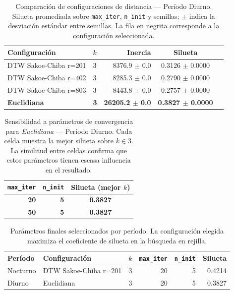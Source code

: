 \begin{table}[ht]
  \centering
  \caption{Comparación de configuraciones de distancia — Período Diurno. Silueta promediada sobre \texttt{max\_iter}, \texttt{n\_init} y semillas; $\pm$ indica la desviación estándar entre semillas. La fila en negrita corresponde a la configuración seleccionada.}
  \label{tab:tuning_config_daytime}
  \begin{tabular}{llrcc}
    \toprule
    \textbf{Configuración} & \textbf{$k$} & \textbf{Inercia} & \textbf{Silueta} \\
    \midrule
    DTW Sakoe-Chiba r=201 & 3 & 8376.9 $\pm$ 0.0 & 0.3126 $\pm$ 0.0000 \\
    DTW Sakoe-Chiba r=402 & 3 & 8285.3 $\pm$ 0.0 & 0.2790 $\pm$ 0.0000 \\
    DTW Sakoe-Chiba r=803 & 3 & 8443.8 $\pm$ 0.0 & 0.2757 $\pm$ 0.0000 \\
    \textbf{Euclidiana} & \textbf{3} & \textbf{26205.2 $\pm$ 0.0} & \textbf{0.3827 $\pm$ 0.0000} \\
    \bottomrule
  \end{tabular}
\end{table}

\begin{table}[ht]
  \centering
  \caption{Sensibilidad a parámetros de convergencia para \textit{Euclidiana} — Período Diurno. Cada celda muestra la mejor silueta sobre $k \in {3}$. La similitud entre celdas confirma que estos parámetros tienen escasa influencia en el resultado.}
  \label{tab:tuning_conv_daytime}
  \begin{tabular}{rrc}
    \toprule
    \textbf{\texttt{max\_iter}} & \textbf{\texttt{n\_init}} & \textbf{Silueta (mejor $k$)} \\
    \midrule
    \textbf{20} & \textbf{5} & \textbf{0.3827} \\
    \textbf{50} & \textbf{5} & \textbf{0.3827} \\
    \bottomrule
  \end{tabular}
\end{table}


\begin{table}[ht]
  \centering
  \caption{Parámetros finales seleccionados por período. La configuración elegida maximiza el coeficiente de silueta en la búsqueda en rejilla.}
  \label{tab:tuning_final}
  \begin{tabular}{llrrrr}
    \toprule
    \textbf{Período} & \textbf{Configuración} & \textbf{$k$} & \textbf{\texttt{max\_iter}} & \textbf{\texttt{n\_init}} & \textbf{Silueta} \\
    \midrule
    Nocturno & DTW Sakoe-Chiba r=201 & 3 & 20 & 5 & 0.4214 \\
    Diurno & Euclidiana & 3 & 20 & 5 & 0.3827 \\
    \bottomrule
  \end{tabular}
\end{table}

